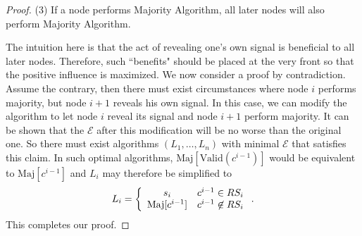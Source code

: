 \documentclass[a4paper,UKenglish]{lipics}
\theoremstyle{definition}
\newcommand{\Maj}{\text{Maj}}
\begin{document}
\begin{proof}
(3) If a node performs Majority Algorithm, all later nodes will also perform Majority Algorithm.
 
The intuition here is that the act of revealing one's own signal is beneficial to all later nodes. 
Therefore, such ``benefits" should be placed at the very front so that the positive influence is maximized.
We now consider a proof by contradiction. 
Assume the contrary, then there must exist circumstances where node $i$ performs majority, but node $i + 1$ reveals his own signal. 
In this case, we can modify the algorithm to let node $i$ reveal its signal and node $i+1$ perform majority. 
It can be shown that the $\mathcal{E}$ after this modification will be no worse than the original one. 
So there must exist algorithms $(L_1, \dots, L_n)$ with minimal $\mathcal{E}$ that satisfies this claim.
In such optimal algorithms, $\Maj[\text{Valid}(c^{i-1})]$ would be equivalent to $\Maj[c^{i-1}]$
	and $L_i$ may therefore be simplified to
\begin{equation*}
L_i 
= \left\{ 
	\begin{array}{c l}
		s_i & c^{i-1} \in RS_i \\
 		\Maj[c^{i-1}] & c^{i-1} \not\in RS_i
 	\end{array}
	\right..
\end{equation*}
This completes our proof.
\end{proof}
\end{document}
